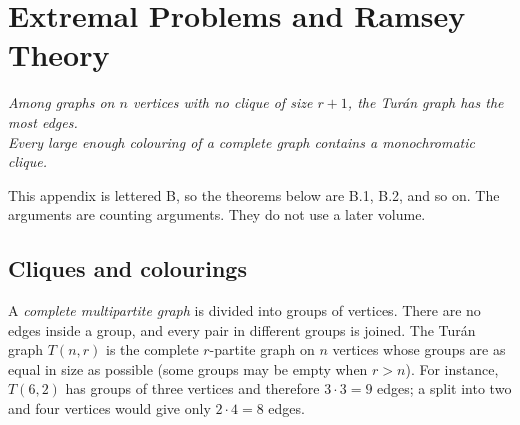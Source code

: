 \chapter{Extremal Problems and Ramsey Theory}
\label{ch:extremal}

\begin{center}\itshape
Among graphs on $n$ vertices with no clique of size $r+1$, the Tur\'an graph has the most edges.\\
Every large enough colouring of a complete graph contains a monochromatic clique.
\end{center}

This appendix is lettered B, so the theorems below are B.1, B.2, and so on. The arguments are counting arguments. They do not use a later volume.

\section{Cliques and colourings}

A \emph{complete multipartite graph} is divided into groups of vertices. There are no edges inside a group, and every pair in different groups is joined. The Tur\'an graph $T(n,r)$ is the complete $r$-partite graph on $n$ vertices whose groups are as equal in size as possible (some groups may be empty when $r>n$). For instance, $T(6,2)$ has groups of three vertices and therefore $3\cdot3=9$ edges; a split into two and four vertices would give only $2\cdot4=8$ edges.

